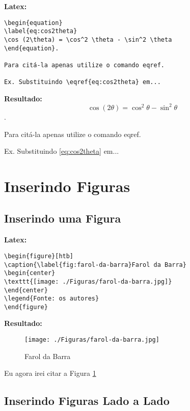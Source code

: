 \begin{apendicesenv}
\textbf{Latex:}
\begin{verbatim}
\begin{equation}
\label{eq:cos2theta}
\cos (2\theta) = \cos^2 \theta - \sin^2 \theta
\end{equation}.

Para citá-la apenas utilize o comando eqref. 

Ex. Substituindo \eqref{eq:cos2theta} em...  
\end{verbatim}



\textbf{Resultado:}\\
\begin{equation}
\label{eq:cos2theta}
\cos (2\theta) = \cos^2 \theta - \sin^2 \theta
\end{equation}.

Para citá-la apenas utilize o comando eqref. 

Ex. Substituindo \eqref{eq:cos2theta} em... 

\newpage
\section{Inserindo Figuras}

\subsection{Inserindo uma Figura}
\textbf{Latex:}
\begin{verbatim}
\begin{figure}[htb]
\caption{\label{fig:farol-da-barra}Farol da Barra}
\begin{center}
\texttt{[image: ./Figuras/farol-da-barra.jpg]}
\end{center}
\legend{Fonte: os autores}
\end{figure}
\end{verbatim}

\textbf{Resultado:}
\begin{figure}[htb]
	\caption{\label{fig:farol-da-barra}Farol da Barra}
	\begin{center}
		\texttt{[image: ./Figuras/farol-da-barra.jpg]}
	\end{center}
\end{figure}

Eu agora irei citar a Figura \ref{fig:farol-da-barra}

\newpage
\subsection{Inserindo Figuras Lado a Lado}


\end{apendicesenv}
